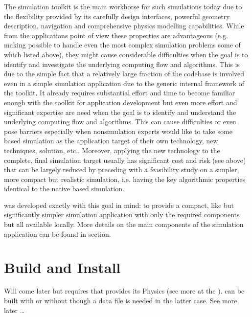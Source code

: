 \documentclass[letterpaper,10pt,english]{sphinxmanual}
\begin{document}
\sphinxAtStartPar
The   simulation toolkit is the main workhorse for such simulations
today due to the flexibility provided by its carefully design interfaces, powerful geometry description, navigation and comprehensive physics
modelling capabilities. While from the applications point of view these properties are advantageous (e.g. making possible to handle even the
most complex simulation problems some of which listed above), they might cause considerable difficulties when the goal is to identify and
investigate the underlying computing flow and algorithms. This is due to the simple fact that a relatively large fraction of the 
codebase is involved even in a simple simulation application due to the generic internal framework of the toolkit. It already requires substantial
effort and time to become familiar enough with the toolkit for application development but even more effort and significant expertise are need
when the goal is to identify and understand the underlying computing flow and algorithms. This can cause difficulties or even pose barriers
especially when non\sphinxhyphen{}simulation experts would like to take some  based simulation as the application target of their own technology,
new techniques, solution, etc.. Moreover, applying the new technology to the complete, final simulation target usually has significant cost and
risk (see above) that can be largely reduced by preceding with a feasibility study on a simpler, more compact but realistic simulation, i.e.
having the key algorithmic properties identical to the native  based simulation.

\sphinxAtStartPar
{} was developed exactly with this goal in mind: to provide a compact,  like but significantly simpler simulation application
with only the required components but all available locally. More details on the main components of the simulation application can be found in
 section.

\sphinxstepscope


\chapter{Build and Install}
\label{\detokenize{IntroAndInstall/install:build-and-install}}\label{\detokenize{IntroAndInstall/install:install-doc}}\label{\detokenize{IntroAndInstall/install::doc}}
\sphinxAtStartPar
Will come later but  requires  that provides its Physics (see more at the {\hyperref[\detokenize{IntroAndInstall/components:simulation-components-doc}]{}}).
 can be built with or without  though a data file is needed
in the latter case. See more later …
\end{document}
